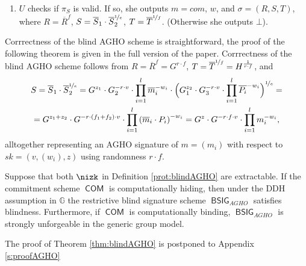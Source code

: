 \documentclass[runningheads]{llncs}
\DeclareMathOperator{\BSIG}{\ensuremath{\mathsf{BSIG}}}
\DeclareMathOperator{\COM}{\ensuremath{\mathsf{COM}}}
\begin{document}
\begin{definition}
\begin{enumerate}
 \item
 \label{prot:blindAGHO:step3} 
$U$ checks if  $\pi_S$ is valid. 
If so, she outputs $m=com$, $w$, and $\sigma= (R,S,T)$, where $R=\overline R^{f}$, $S= \overline S_1\cdot \overline S_2^{\nicefrac{1}{e}}$, $T= \overline T^{\nicefrac{1}{f}}$.
(Otherwise she outputs $\bot$).
\end{enumerate}
\end{definition}

\ifCANS
Corrrectness of the blind AGHO scheme is straightforward, the proof of the following theorem  is given in the full version of the paper.
\else
Corrrectness of the blind AGHO scheme follows from $R= \overline R^f = G^{r \cdot f}$, $T = \overline T^{\nicefrac{1}{f}} = H^{\frac{1}{r\cdot f}}$, and 
\begin{multline*}
S = \overline S_1 \cdot \overline S_2^{\nicefrac{1}{e}}  =  G^{z_1} \cdot G_2^{-r\cdot v} \cdot \prod_{i=1}^l \overline m_i^{-w_i} \cdot \Big(G_1^{z_2} \cdot G_3^{-r\cdot v} \cdot \prod_{i=1}^l \overline{P_i}^{-w_i}\Big)^{\nicefrac{1}{e}} = 
\\
= G^{z_1 + z_2}\cdot G^{-r\cdot (f_1 + f_2) \cdot v} \cdot \prod_{i=1}^l \left(\overline m_i\cdot P_i\right)^{-w_i}
 = G^{z}\cdot G^{-r\cdot f \cdot v} \cdot \prod_{i=1}^l m_i^{-w_i},
\end{multline*}
alltogether representing an AGHO signature of $m=(m_i)$ with respect to $sk=(v,(w_i), z)$ using randomness $r\cdot f$.
\fi




\begin{theorem}
\label{thm:blindAGHO}
Suppose that both $\nizk$ in Definition \ref{prot:blindAGHO} are extractable.
If the commitment scheme $\COM$ is computationally hiding, then under the DDH assumption in $\mathbb G$ the restrictive blind signature scheme $\BSIG_{AGHO}$  satisfies blindness.
Furthermore, if $\COM$ is computationally binding, $\BSIG_{AGHO}$ is strongly unforgeable in the generic group model.
\end{theorem}
\ifCANS
\else
The proof of Theorem \ref{thm:blindAGHO}  is postponed to Appendix \ref{s:proofAGHO}
\fi

\end{document}
